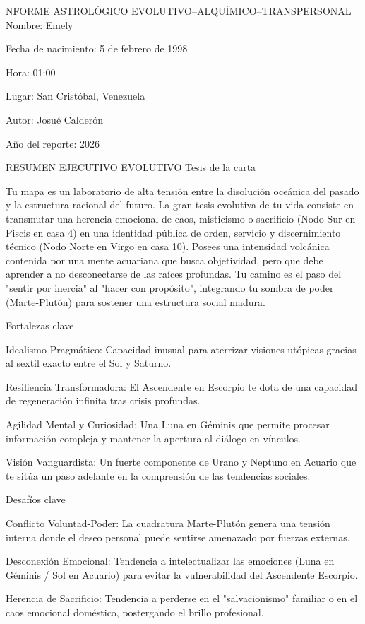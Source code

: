 NFORME ASTROLÓGICO EVOLUTIVO–ALQUÍMICO–TRANSPERSONAL
Nombre: Emely

Fecha de nacimiento: 5 de febrero de 1998

Hora: 01:00

Lugar: San Cristóbal, Venezuela

Autor: Josué Calderón

Año del reporte: 2026

RESUMEN EJECUTIVO EVOLUTIVO
Tesis de la carta

Tu mapa es un laboratorio de alta tensión entre la disolución oceánica del pasado y la estructura racional del futuro. La gran tesis evolutiva de tu vida consiste en transmutar una herencia emocional de caos, misticismo o sacrificio (Nodo Sur en Piscis en casa 4) en una identidad pública de orden, servicio y discernimiento técnico (Nodo Norte en Virgo en casa 10). Posees una intensidad volcánica contenida por una mente acuariana que busca objetividad, pero que debe aprender a no desconectarse de las raíces profundas. Tu camino es el paso del "sentir por inercia" al "hacer con propósito", integrando tu sombra de poder (Marte-Plutón) para sostener una estructura social madura.

Fortalezas clave

Idealismo Pragmático: Capacidad inusual para aterrizar visiones utópicas gracias al sextil exacto entre el Sol y Saturno.

Resiliencia Transformadora: El Ascendente en Escorpio te dota de una capacidad de regeneración infinita tras crisis profundas.

Agilidad Mental y Curiosidad: Una Luna en Géminis que permite procesar información compleja y mantener la apertura al diálogo en vínculos.

Visión Vanguardista: Un fuerte componente de Urano y Neptuno en Acuario que te sitúa un paso adelante en la comprensión de las tendencias sociales.

Desafíos clave

Conflicto Voluntad-Poder: La cuadratura Marte-Plutón genera una tensión interna donde el deseo personal puede sentirse amenazado por fuerzas externas.

Desconexión Emocional: Tendencia a intelectualizar las emociones (Luna en Géminis / Sol en Acuario) para evitar la vulnerabilidad del Ascendente Escorpio.

Herencia de Sacrificio: Tendencia a perderse en el "salvacionismo" familiar o en el caos emocional doméstico, postergando el brillo profesional.

